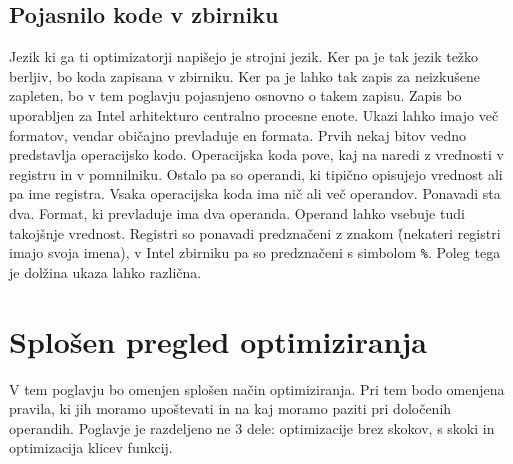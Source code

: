 \documentclass[a4paper, 12pt]{book}
\begin{document}
\section{Pojasnilo kode v zbirniku}
Jezik ki ga ti optimizatorji napišejo je strojni jezik. Ker pa je tak jezik težko berljiv, bo koda zapisana v zbirniku. Ker pa je lahko tak zapis za neizkušene zapleten, bo v tem poglavju pojasnjeno osnovno o takem zapisu. Zapis bo uporabljen za Intel arhitekturo centralno procesne enote. Ukazi lahko imajo več formatov, vendar običajno prevladuje en formata. Prvih nekaj bitov vedno predstavlja operacijsko kodo. Operacijska koda pove, kaj na naredi z vrednosti v registru in v pomnilniku. Ostalo pa so operandi, ki tipično opisujejo vrednost ali pa ime registra. Vsaka operacijska koda ima nič ali več operandov. Ponavadi sta dva. Format, ki prevladuje ima dva operanda. Operand lahko vsebuje tudi takojšnje vrednost. Registri so ponavadi predznačeni z znakom \r (nekateri registri imajo svoja imena), v Intel zbirniku pa so predznačeni s simbolom \texttt{\%}. Poleg tega je dolžina ukaza lahko različna.
\chapter{Splošen pregled optimiziranja}
V tem poglavju bo omenjen splošen način optimiziranja. Pri tem bodo omenjena pravila, ki jih moramo upoštevati in na kaj moramo paziti pri določenih operandih. Poglavje je razdeljeno ne 3 dele: optimizacije brez skokov, s skoki in optimizacija klicev funkcij.
\end{document}
